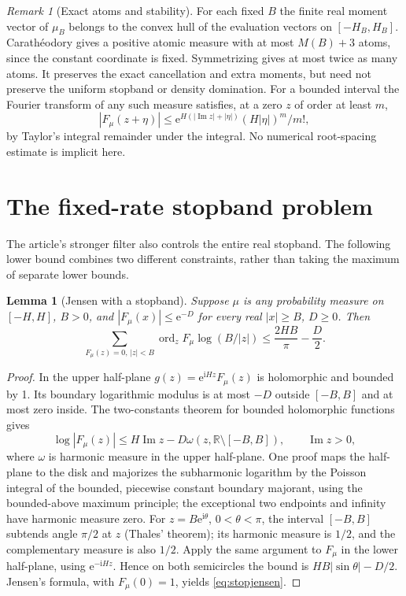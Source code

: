 \documentclass[11pt]{article}
\newtheorem{lemma}[theorem]{Lemma}
\theoremstyle{remark}\newtheorem{remark}[theorem]{Remark}
\newcommand{\R}{\mathbb R}\newcommand{\C}{\mathbb C}\newcommand{\e}{\mathrm e}\newcommand{\ii}{\mathrm i}\newcommand{\dd}{\,\mathrm d}\newcommand{\abs}[1]{\left|#1\right|}\newcommand{\norm}[1]{\left\|#1\right\|}\newcommand{\ord}{\operatorname{ord}}\newcommand{\re}{\operatorname{Re}}\newcommand{\im}{\operatorname{Im}}\newcommand{\supp}{\operatorname{supp}}
\begin{document}
\begin{remark}[Exact atoms and stability]
For each fixed $B$ the finite real moment vector of $\mu_B$ belongs to the convex hull of the evaluation vectors on $[-H_B,H_B]$. Carath\'eodory gives a positive atomic measure with at most $M(B)+3$ atoms, since the constant coordinate is fixed. Symmetrizing gives at most twice as many atoms. It preserves the exact cancellation and extra moments, but need not preserve the uniform stopband or density domination. For a bounded interval the Fourier transform of any such measure satisfies, at a zero $z$ of order at least $m$,
\[
|F_\mu(z+\eta)|\le \e^{H(|\im z|+|\eta|)}(H|\eta|)^m/m!,
\]
by Taylor's integral remainder under the integral. No numerical root-spacing estimate is implicit here.
\end{remark}

\section{The fixed-rate stopband problem}
\label{sec:stop}
The article's stronger filter also controls the entire real stopband. The following lower bound combines two different constraints, rather than taking the maximum of separate lower bounds.
\begin{lemma}[Jensen with a stopband]\label{lem:stoplower}
Suppose $\mu$ is any probability measure on $[-H,H]$, $B>0$, and $|F_\mu(x)|\le\e^{-D}$ for every real $|x|\ge B$, $D\ge0$. Then
\begin{equation}\label{eq:stopjensen}
\sum_{F_\mu(z)=0,\,|z|< B}\ord_z F_\mu\log(B/|z|)\le \frac{2HB}{\pi}-\frac D2.
\end{equation}
\end{lemma}
\begin{proof}
In the upper half-plane $g(z)=\e^{\ii Hz}F_\mu(z)$ is holomorphic and bounded by 1. Its boundary logarithmic modulus is at most $-D$ outside $[-B,B]$ and at most zero inside. The two-constants theorem for bounded holomorphic functions gives
\[
\log|F_\mu(z)|\le H\im z-D\omega(z,\R\setminus[-B,B]),\qquad\im z>0,
\]
where $\omega$ is harmonic measure in the upper half-plane. One proof maps the half-plane to the disk and majorizes the subharmonic logarithm by the Poisson integral of the bounded, piecewise constant boundary majorant, using the bounded-above maximum principle; the exceptional two endpoints and infinity have harmonic measure zero. For $z=B\e^{\ii\theta}$, $0<\theta<\pi$, the interval $[-B,B]$ subtends angle $\pi/2$ at $z$ (Thales' theorem); its harmonic measure is $1/2$, and the complementary measure is also $1/2$. Apply the same argument to $F_\mu$ in the lower half-plane, using $\e^{-\ii Hz}$. Hence on both semicircles the bound is $HB|\sin\theta|-D/2$. Jensen's formula, with $F_\mu(0)=1$, yields \eqref{eq:stopjensen}.
\end{proof}
\end{document}
